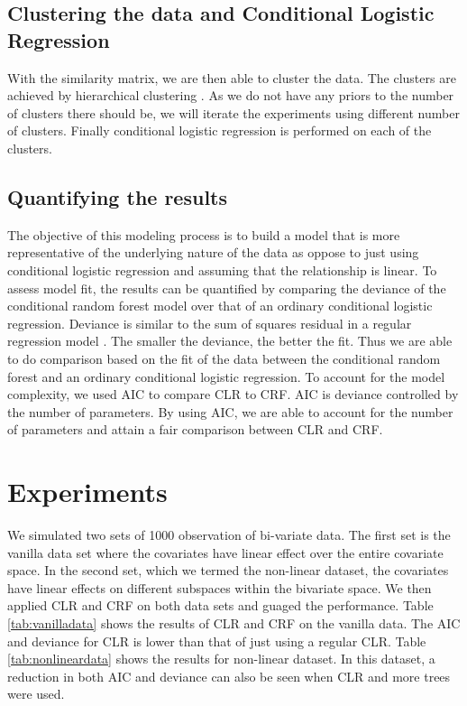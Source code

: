\documentclass[twoside,11pt]{article}
\begin{document}
\subsection{Clustering the data and Conditional Logistic Regression}
With the similarity matrix, we are then able to cluster the data. The clusters are achieved by hierarchical clustering \citep{Johnson67}. As we do not have any priors to the number of clusters there should be, we will iterate the experiments using different number of clusters. Finally conditional logistic regression is performed on each of the clusters.

\subsection{Quantifying the results}
The objective of this modeling process is to build a model that is more representative of the underlying nature of the data as oppose to just using conditional logistic regression and assuming that the relationship is linear. To assess model fit, the results can be quantified by comparing the deviance of the conditional random forest model over that of an ordinary conditional logistic regression. Deviance is similar to the sum of squares residual in a regular regression model \citep{pdSAS99}. The smaller the deviance, the better the fit. Thus we are able to do comparison based on the fit of the data between the conditional random forest and an ordinary conditional logistic regression. To account for the model complexity, we used AIC to compare CLR to CRF. AIC is deviance controlled by the number of parameters. By using AIC, we are able to account for the number of parameters and attain a fair comparison between CLR and CRF. 

\section{Experiments}
We simulated two sets of 1000 observation of bi-variate data. The first set is the vanilla data set where the covariates have linear effect over the entire covariate space. In the second set, which we termed the non-linear dataset, the covariates have linear effects on different subspaces within the bivariate space. We then applied CLR and CRF on both data sets and guaged the performance. Table \ref{tab:vanilladata} shows the results of CLR and CRF on the vanilla data. The AIC and deviance for CLR is lower than that of just using a regular CLR. Table \ref{tab:nonlineardata} shows the results for non-linear dataset. In this dataset, a reduction in both AIC and deviance can also be seen when CLR and more trees were used.  
\end{document}
